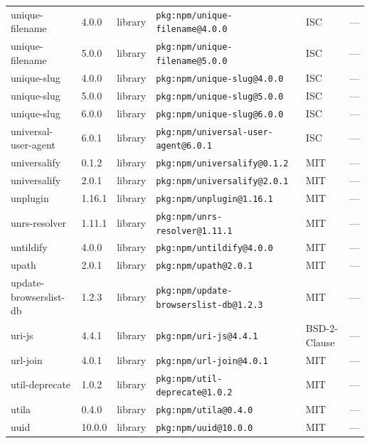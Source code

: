\documentclass[11pt,a4paper]{article}
\begin{document}
\begin{longtable}{|p{4cm}|p{2cm}|p{1.6cm}|p{5cm}|p{1.5cm}|p{3.5cm}|}
\raggedright unique-filename & 4.0.0 & library & \small\texttt{pkg:npm/unique-filename@4.0.0} & ISC & \small — \\
\raggedright unique-filename & 5.0.0 & library & \small\texttt{pkg:npm/unique-filename@5.0.0} & ISC & \small — \\
\raggedright unique-slug & 4.0.0 & library & \small\texttt{pkg:npm/unique-slug@4.0.0} & ISC & \small — \\
\raggedright unique-slug & 5.0.0 & library & \small\texttt{pkg:npm/unique-slug@5.0.0} & ISC & \small — \\
\raggedright unique-slug & 6.0.0 & library & \small\texttt{pkg:npm/unique-slug@6.0.0} & ISC & \small — \\
\raggedright universal-user-agent & 6.0.1 & library & \small\texttt{pkg:npm/universal-user-agent@6.0.1} & ISC & \small — \\
\raggedright universalify & 0.1.2 & library & \small\texttt{pkg:npm/universalify@0.1.2} & MIT & \small — \\
\raggedright universalify & 2.0.1 & library & \small\texttt{pkg:npm/universalify@2.0.1} & MIT & \small — \\
\raggedright unplugin & 1.16.1 & library & \small\texttt{pkg:npm/unplugin@1.16.1} & MIT & \small — \\
\raggedright unrs-resolver & 1.11.1 & library & \small\texttt{pkg:npm/unrs-resolver@1.11.1} & MIT & \small — \\
\raggedright untildify & 4.0.0 & library & \small\texttt{pkg:npm/untildify@4.0.0} & MIT & \small — \\
\raggedright upath & 2.0.1 & library & \small\texttt{pkg:npm/upath@2.0.1} & MIT & \small — \\
\raggedright update-browserslist-db & 1.2.3 & library & \small\texttt{pkg:npm/update-browserslist-db@1.2.3} & MIT & \small — \\
\raggedright uri-js & 4.4.1 & library & \small\texttt{pkg:npm/uri-js@4.4.1} & BSD-2-Clause & \small — \\
\raggedright url-join & 4.0.1 & library & \small\texttt{pkg:npm/url-join@4.0.1} & MIT & \small — \\
\raggedright util-deprecate & 1.0.2 & library & \small\texttt{pkg:npm/util-deprecate@1.0.2} & MIT & \small — \\
\raggedright utila & 0.4.0 & library & \small\texttt{pkg:npm/utila@0.4.0} & MIT & \small — \\
\raggedright uuid & 10.0.0 & library & \small\texttt{pkg:npm/uuid@10.0.0} & MIT & \small — \\

\end{longtable}
\end{document}
